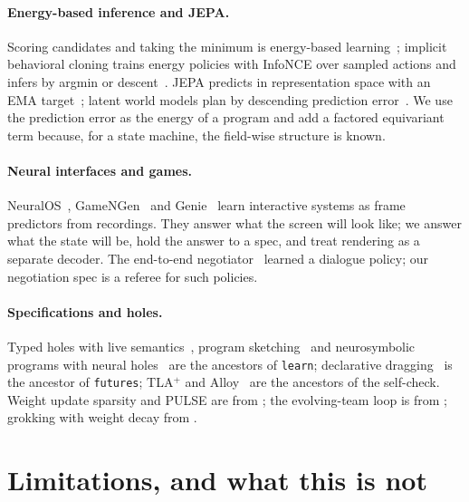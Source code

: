 \documentclass{article}
\theoremstyle{plain}
\theoremstyle{definition}
\theoremstyle{remark}
\begin{document}
\paragraph{Energy-based inference and JEPA.} Scoring candidates and taking the minimum is energy-based learning~\citep{lecun2006tutorial}; implicit behavioral cloning trains energy policies with InfoNCE over sampled actions and infers by argmin or descent~\citep{florence2021ibc}. JEPA predicts in representation space with an EMA target~\citep{lecun2022path,assran2023ijepa,grill2020byol}; latent world models plan by descending prediction error~\citep{zhou2024dinowm,sobal2025pldm}. We use the prediction error as the energy of a program and add a factored equivariant term because, for a state machine, the field-wise structure is known.

\paragraph{Neural interfaces and games.} NeuralOS~\citep{rivard2026neuralos}, GameNGen~\citep{valevski2024gamengen} and Genie~\citep{bruce2024genie} learn interactive systems as frame predictors from recordings. They answer what the screen will look like; we answer what the state will be, hold the answer to a spec, and treat rendering as a separate decoder. The end-to-end negotiator~\citep{lewis2017deal} learned a dialogue policy; our negotiation spec is a referee for such policies.

\paragraph{Specifications and holes.} Typed holes with live semantics~\citep{omar2019hazel}, program sketching~\citep{solar2008sketch} and neurosymbolic programs with neural holes~\citep{gaunt2016terpret,chaudhuri2021neurosymbolic} are the ancestors of \texttt{learn}; declarative dragging~\citep{dragology} is the ancestor of \texttt{futures}; TLA$^+$ and Alloy~\citep{lamport2002tla,jackson2012alloy} are the ancestors of the self-check. Weight update sparsity and PULSE are from \citet{miahi2026pulse}; the evolving-team loop is from \citet{cao2026eat}; grokking with weight decay from \citet{power2022grokking,nanda2023progress}.

\section{Limitations, and what this is not}
\label{sec:limits}
\end{document}
